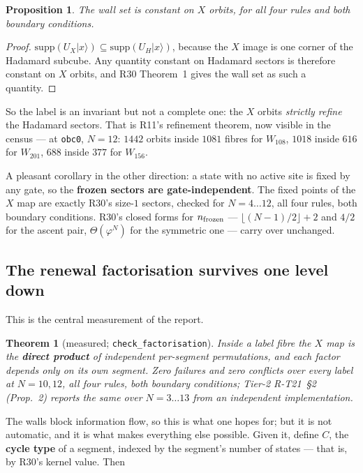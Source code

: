 \documentclass[11pt]{article}
\newcommand{\rt}[1]{\texttt{#1}}
\newcommand{\fn}[1]{\texttt{#1}}
\theoremstyle{plain}
\newtheorem{theorem}{Theorem}
\newtheorem{proposition}{Proposition}
\theoremstyle{remark}
\begin{document}
\begin{proposition}
The wall set is constant on $X$ orbits, for all four rules and both boundary
conditions.
\end{proposition}

\begin{proof}
$\mathrm{supp}(U_X|x\rangle)\subseteq\mathrm{supp}(U_H|x\rangle)$, because the
$X$ image is one corner of the Hadamard subcube. Any quantity constant on
Hadamard sectors is therefore constant on $X$ orbits, and R30 Theorem~1 gives the
wall set as such a quantity.
\end{proof}

\noindent So the label is an invariant but not a complete one: the $X$ orbits
\emph{strictly refine} the Hadamard sectors. That is R11's refinement theorem,
now visible in the census --- at \rt{obc0}, $N=12$: $1442$ orbits inside $1081$
fibres for $W_{108}$, $1018$ inside $616$ for $W_{201}$, $688$ inside $377$ for
$W_{156}$.

A pleasant corollary in the other direction: a state with no active site is fixed
by any gate, so the \textbf{frozen sectors are gate-independent}. The fixed points
of the $X$ map are exactly R30's size-$1$ sectors, checked for $N=4\ldots12$, all
four rules, both boundary conditions. R30's closed forms for $n_{\rm frozen}$ ---
$\lfloor(N-1)/2\rfloor+2$ and $4/2$ for the ascent pair, $\Theta(\varphi^N)$ for
the symmetric one --- carry over unchanged.

\subsection{The renewal factorisation survives one level down}

This is the central measurement of the report.

\begin{theorem}[measured; \fn{check\_factorisation}]
\label{thm:factor}
Inside a label fibre the $X$ map is the \textbf{direct product} of independent
per-segment permutations, and each factor depends only on its own segment.
Zero failures and zero conflicts over every label at $N=10,12$, all four rules,
both boundary conditions; Tier-2 R-T21~\S2 (Prop.~2) reports the same over
$N=3\ldots13$ from an independent implementation.
\end{theorem}

\noindent The walls block information flow, so this is what one hopes for; but it
is not automatic, and it is what makes everything else possible. Given it, define
$C$, the \textbf{cycle type} of a segment, indexed by the segment's number of
states --- that is, by R30's kernel value. Then
\end{document}

